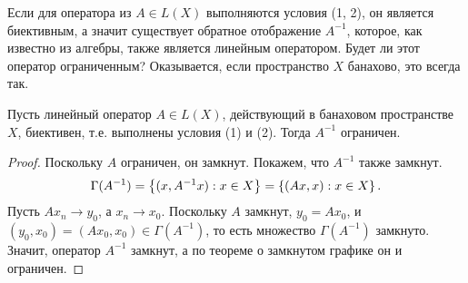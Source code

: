 Если для оператора из $A \in L(X)$ выполняются условия (1, 2), он является биективным,
а значит существует обратное отображение $A^{-1}$, которое, как известно из алгебры, также
является линейным оператором. Будет ли этот оператор ограниченным? Оказывается, если пространство
$X$ банахово, это всегда так.

\begin{theorem}
    Пусть линейный оператор $A \in L(X)$, действующий в банаховом пространстве $X$, биективен, т.е. 
    выполнены условия (1) и (2). Тогда $A^{-1}$ ограничен.
\end{theorem}

\begin{proof}
    Поскольку $A$ ограничен, он замкнут. Покажем, что $A^{-1}$ также замкнут.
    \[ \Gamma(A^{-1}) = \left\{(x, A^{-1}x) : x \in X\right\} = \left\{(Ax, x) : x \in X\right\}. \]
    Пусть $Ax_n \to y_0$, а $x_n \to x_0$. Поскольку $A$ замкнут, $y_0 = Ax_0$, и
    $(y_0, x_0) = (Ax_0, x_0) \in \Gamma(A^{-1})$, то есть множество $\Gamma(A^{-1})$ замкнуто.
    Значит, оператор $A^{-1}$ замкнут, а по теореме о замкнутом графике он и ограничен.
\end{proof}

